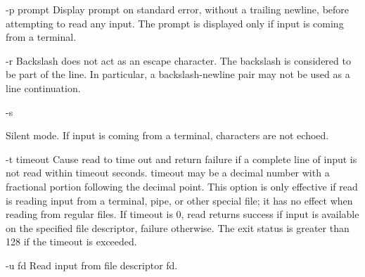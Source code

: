 {{{-p prompt
Display prompt on standard error, without a trailing newline, before attempting to read any input. The prompt is displayed only if input is coming from a terminal.

-r
Backslash does not act as an escape character. The backslash is considered to be part of the line. In particular, a backslash-newline pair may not be used as a line continuation.

-s

Silent mode. If input is coming from a terminal, characters are not echoed.

-t timeout
Cause read to time out and return failure if a complete line of input is not read within timeout seconds. timeout may be a decimal number with a fractional portion following the decimal point. This option is only effective if read is reading input from a terminal, pipe, or other special file; it has no effect when reading from regular files. If timeout is 0, read returns success if input is available on the specified file descriptor, failure otherwise. The exit status is greater than 128 if the timeout is exceeded.

-u fd
Read input from file descriptor fd.

}}}
